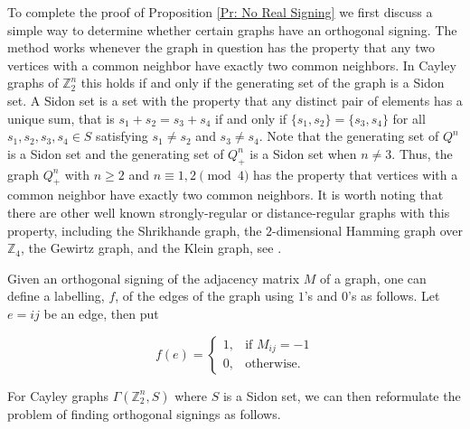 To complete the proof of Proposition \ref{Pr: No Real Signing} we first discuss a simple way to determine whether certain graphs have an orthogonal signing. The method works whenever the graph in question has the property that any two vertices with a common neighbor have exactly two common neighbors. In Cayley graphs of ${\mathbb{Z}_{2}^{n}}$ this holds if and only if the generating set of the graph is a Sidon set.
A Sidon set is a set with the property that any distinct pair of 
elements has a unique sum, that is $s_1+s_2 = s_3 + s_4$ if and only if $\{s_1, s_2\} 
= \{s_3, s_4\}$ for all $s_1, s_2, s_3, s_4 \in S$ satisfying $s_1 \neq s_2$ and $s_3 \neq s_4$. 
Note that the generating set of $Q^n$ is a Sidon set and the generating 
set of $Q_{+}^{n}$ is a Sidon set when $n \neq 3$. Thus, the 
graph $Q_+^n$ with $n \geq 2$ and $n \equiv 1, 2 \pmod{4}$ has the 
property that vertices with a common neighbor have exactly two common 
neighbors. It is worth noting that there are other 
well known strongly-regular or distance-regular graphs 
with this property, including the 
Shrikhande graph, the $2$-dimensional Hamming graph 
over $\mathbb{Z}_4$, the Gewirtz graph, and the Klein graph,
see \cite{BCN}. 

Given an orthogonal signing of the adjacency matrix $M$ of
a graph, one can define a labelling, $f$, of the edges of the graph 
using $1$'s and $0$'s as follows. Let $e = ij$ be an edge, then put

\[
    f(e)= 
\begin{cases}
    1,& \text{if } M_{ij} = -1\\
    0,              & \text{otherwise.}
\end{cases}
\]

    
For Cayley graphs $\Gamma({\mathbb{Z}_{2}^{n}}, S)$ where $S$ is a Sidon set, 
we can then reformulate the problem of finding orthogonal signings as follows.

